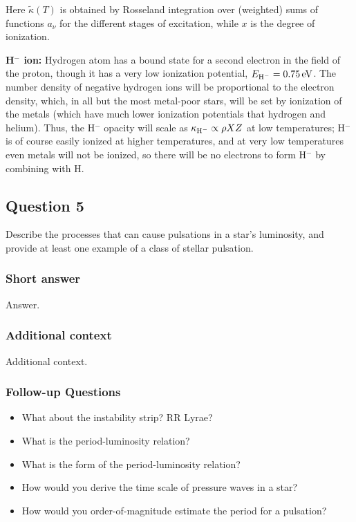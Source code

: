 \documentclass[a4paper,10pt]{article}
\begin{document}
{\noindent}Here $\tilde{\kappa}(T)$ is obtained by Rosseland integration over (weighted) sums of functions $a_\nu$ for the different stages of excitation, while $x$ is the degree of ionization.

{\noindent}\textbf{H$^-$ ion:} Hydrogen atom has a bound state for a second electron in the field of the proton, though it has a very low ionization potential, $E_{{\rm H}^-}=0.75\,{\rm eV}$. The number density of negative hydrogen ions will be proportional to the electron density, which, in all but the most metal-poor stars, will be set by ionization of the metals (which have much lower ionization potentials that hydrogen and helium). Thus, the H$^-$ opacity will scale as $\kappa_{{\rm H}^-} \propto \rho XZ$ at low temperatures; H$^-$ is of course easily ionized at higher temperatures, and at very low temperatures even metals will not be ionized, so there will be no electrons to form H$^-$ by combining with H.


\newpage
\subsection{Question 5}

Describe the processes that can cause pulsations in a star’s luminosity, and provide at least one example of a class of stellar pulsation.

\subsubsection{Short answer}

Answer.

\subsubsection{Additional context}

Additional context.

\subsubsection{Follow-up Questions}

\begin{itemize}
    \item What about the instability strip? RR Lyrae?
    \item What is the period-luminosity relation?
    \item What is the form of the period-luminosity relation?
    \item How would you derive the time scale of pressure waves in a star?
    \item How would you order-of-magnitude estimate the period for a pulsation?
\end{itemize}
\end{document}
